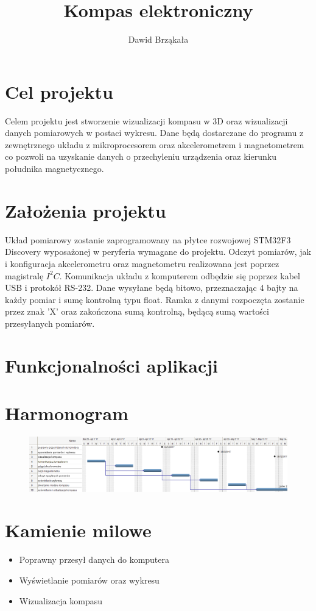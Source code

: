 \documentclass{article}
\title{Kompas elektroniczny}
\author{Dawid Brząkała}
\date{}
\begin{document}
\maketitle

\section{Cel projektu}
Celem projektu jest stworzenie wizualizacji kompasu w 3D oraz wizualizacji danych pomiarowych w postaci wykresu. Dane będą dostarczane do programu z zewnętrznego układu z mikroprocesorem oraz akcelerometrem i magnetometrem co pozwoli na uzyskanie danych o przechyleniu urządzenia oraz kierunku południka magnetycznego.

\section{Założenia projektu}
Układ pomiarowy zostanie zaprogramowany na płytce rozwojowej STM32F3 Discovery wyposażonej w peryferia wymagane do projektu. Odczyt pomiarów, jak i konfiguracja akcelerometru oraz magnetometru realizowana jest poprzez magistralę $I^2C$. Komunikacja układu z komputerem odbędzie się poprzez kabel USB i protokół RS-232. Dane wysyłane będą bitowo, przeznaczając 4 bajty na każdy pomiar i sumę kontrolną typu float. Ramka z danymi rozpoczęta zostanie przez znak 'X' oraz zakończona sumą kontrolną, będącą sumą  wartości przesyłanych pomiarów.
\section{Funkcjonalności aplikacji}

\section{Harmonogram}
\begin{figure}[H]
  \centering
  \includegraphics[width=\linewidth]{wds.png}
\end{figure}

\section{Kamienie milowe}
\begin{itemize}[noitemsep]
\item Poprawny przesył danych do komputera
\item Wyświetlanie pomiarów oraz wykresu
\item Wizualizacja kompasu
\end{itemize}
\end{document}

